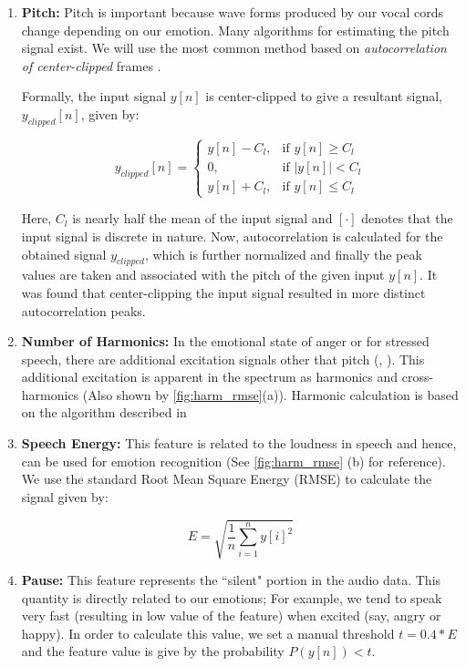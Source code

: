 \documentclass[11pt,a4paper]{article}
\begin{document}
\begin{enumerate}
\item \textbf{Pitch:} Pitch is important because wave forms produced by our vocal cords change depending on our emotion. Many algorithms for estimating the pitch signal exist. We will use the most common method based on \textit{autocorrelation of center-clipped} frames \cite{sondhi1968new}.


Formally, the input signal $y[n]$ is center-clipped to give a resultant signal, $y_{clipped}[n]$, given by:


\[
y_{clipped}[n]= 
\begin{cases}
y[n] - C_l,& \text{if } y[n]\geq C_l\\
0,              & \text{if } |y[n]| < C_l\\
y[n] + C_l, & \text{if } y[n] \leq C_l
\end{cases}
\]

Here, $C_l$ is nearly half the mean of the input signal and $[\cdot]$ denotes that the input signal is discrete in nature. Now, autocorrelation is calculated for the obtained signal $y_{clipped}$, which is further normalized and finally the peak values are taken and associated with the pitch of the given input $y[n]$. It was found that center-clipping the input signal resulted in more distinct autocorrelation peaks.

\item \textbf{Number of Harmonics:} In the emotional state of anger or for stressed speech, there are additional excitation signals other that pitch (\cite{teager1990evidence}, \cite{zhou2001nonlinear}). This additional excitation is apparent in the spectrum as harmonics and cross-harmonics (Also shown by \ref{fig:harm_rmse}(a)). Harmonic calculation is based on the algorithm described in \cite{fitzgerald2010harmonic}


\item \textbf{Speech Energy:} This feature is related to the loudness in speech and hence, can be used for emotion recognition (See \ref{fig:harm_rmse} (b) for reference). We use the standard Root Mean Square Energy (RMSE) to calculate the signal given by:

\begin{equation}
	E = \sqrt{\frac{1}{n}\sum_{i=1}^{n} y[i]^{2}}
\end{equation}

\item \textbf{Pause:} This feature represents the ``silent" portion in the audio data. This quantity is directly related to our emotions; For example, we tend to speak very fast (resulting in low value of the feature) when excited (say, angry or happy). In order to calculate this value, we set a manual threshold $t = 0.4*E$ and the feature value is give by the probability $P(y[n]) < t$.
\end{enumerate}
\end{document}

